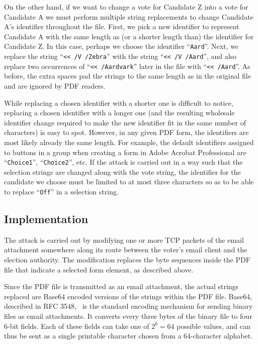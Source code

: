 \documentclass{article}
\newcommand{\etc}{etc.\xspace}
\begin{document}
On the other hand, if we want to change a vote for Candidate Z into a
vote for Candidate A we must perform multiple string replacements to
change Candidate A's identifier throughout the file.  First, we pick a
new identifier to represent Candidate A with the same length as (or a
shorter length than) the identifier for Candidate Z. In this case,
perhaps we choose the identifier ``\texttt{Aard}''. Next, we replace
the string ``\texttt{<{}< /V /Zebra}'' with the string ``\texttt{<{}<
  /V /Aard\textvisiblespace}'', and also replace two occurrences of
``\texttt{<{}< /Aardvark}'' later in the file with ``\texttt{<{}<
  /Aard\textvisiblespace\textvisiblespace\textvisiblespace\textvisiblespace}''. As
before, the extra spaces pad the strings to the same length as in the
original file and are ignored by PDF readers.

While replacing a chosen identifier with a shorter one is difficult to
notice, replacing a chosen identifier with a longer one (and the
resulting wholesale identifier change required to make the new
identifier fit in the same number of characters) is easy to
spot. However, in any given PDF form, the identifiers are most likely
already the same length. For example, the default identifiers assigned
to buttons in a group when creating a form in Adobe Acrobat
Professional are ``\texttt{Choice1}'', ``\texttt{Choice2}'', \etc If
the attack is carried out in a way such that the selection strings are
changed along with the vote string, the identifier for the candidate
we choose must be limited to at most three characters so as to be able
to replace ``\texttt{Off}'' in a selection string.


\subsection{Implementation}

The attack is carried out by modifying one or more TCP packets of the
email attachment somewhere along its route between the voter's email
client and the election authority. The modification replaces the byte
sequences inside the PDF file that indicate a selected form element,
as described above.

Since the PDF file is transmitted as an email attachment, the actual
strings replaced are Base64 encoded versions of the strings within the
PDF file. Base64, described in RFC 3548,~\cite{RFC3548} is the
standard encoding mechanism for sending binary files as email
attachments. It converts every three bytes of the binary file to four
6-bit fields. Each of these fields can take one of $2^6=64$ possible
values, and can thus be sent as a single printable character chosen
from a 64-character alphabet. 
\end{document}

